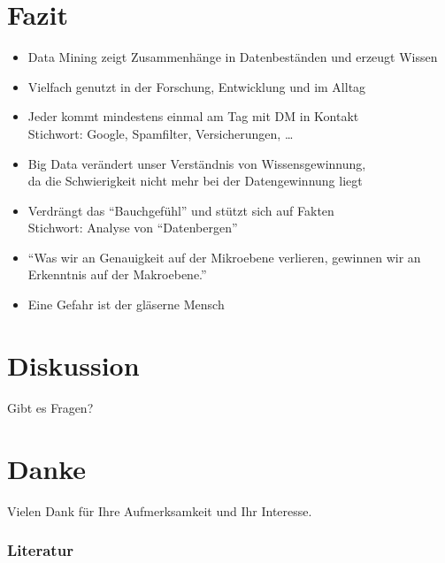 \documentclass[fleqn,11pt,aspectratio=43]{beamer}
\begin{document}
\section{Fazit~}
\begin{frame}{\insertsectionhead}
\begin{itemize}
\item Data Mining zeigt Zusammenhänge in Datenbeständen und erzeugt Wissen
\item Vielfach genutzt in der Forschung, Entwicklung und im Alltag
\item Jeder kommt mindestens einmal am Tag mit DM in Kontakt \\ Stichwort: Google, Spamfilter, Versicherungen, \ldots
\item Big Data verändert unser Verständnis von Wissensgewinnung, \\ da die Schwierigkeit nicht mehr bei der Datengewinnung liegt
\item Verdrängt das \enquote{Bauchgefühl} und stützt sich auf Fakten \\ Stichwort: Analyse von \enquote{Datenbergen}
\item \enquote{Was wir an Genauigkeit auf der Mikroebene verlieren, gewinnen wir an Erkenntnis
auf der Makroebene.} \cite{mayer2014big}
\item Eine Gefahr ist der gläserne Mensch
\end{itemize}
\end{frame}

\section*{Diskussion~}
\begin{frame}[highlight]{\insertsectionhead}
\centering
Gibt es Fragen?
\end{frame}

\section*{Danke~}
\begin{frame}{\insertsectionhead}
\centering
Vielen Dank für Ihre Aufmerksamkeit und Ihr Interesse.
\end{frame}

\begin{frame}[allowframebreaks]
\frametitle{Literatur}
%

\end{frame}
\end{document}
